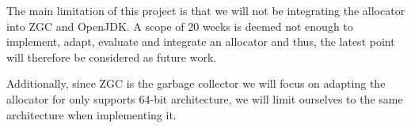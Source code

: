 
The main limitation of this project is that we will not be integrating the allocator into ZGC and OpenJDK. A scope of 20 weeks is deemed not enough to implement, adapt, evaluate and integrate an allocator and thus, the latest point will therefore be considered as future work.

Additionally, since ZGC is the garbage collector we will focus on adapting the allocator for only supports 64-bit architecture, we will limit ourselves to the same architecture when implementing it.


